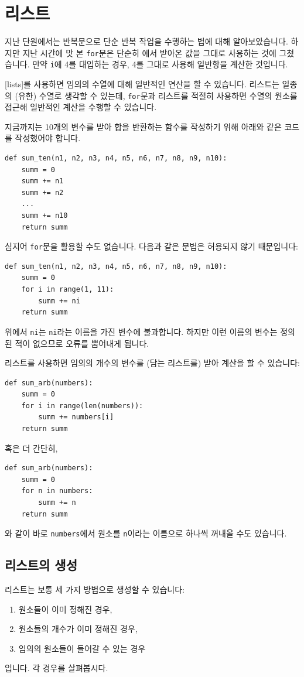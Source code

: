 \documentclass[../main.tex]{subfiles}
\begin{document}
\section{리스트}
지난 단원에서는 반복문으로 단순 반복 작업을 수행하는 법에 대해 알아보았습니다.
하지만 지난 시간에 맛 본 \texttt{for}문은 단순히 에서 받아온 값을 그대로 사용하는 것에 그쳤습니다.
만약 \texttt{i}에 4를 대입하는 경우, 4를 그대로 사용해 일반항을 계산한 것입니다.

[lists]를 사용하면 임의의 수열에 대해 일반적인 연산을 할 수 있습니다.
리스트는 일종의 (유한) 수열로 생각할 수 있는데, \texttt{for}문과 리스트를 적절히 사용하면 수열의 원소를 접근해 일반적인 계산을 수행할 수 있습니다.

지금까지는 10개의 변수를 받아 합을 반환하는 함수를 작성하기 위해 아래와 같은 코드를 작성했어야 합니다.
\begin{verbatim}
def sum_ten(n1, n2, n3, n4, n5, n6, n7, n8, n9, n10):
    summ = 0
    summ += n1
    summ += n2
    ...
    summ += n10
    return summ
\end{verbatim}
심지어 \texttt{for}문을 활용할 수도 없습니다.
다음과 같은 문법은 허용되지 않기 때문입니다:
\begin{verbatim}
def sum_ten(n1, n2, n3, n4, n5, n6, n7, n8, n9, n10):
    summ = 0
    for i in range(1, 11):
        summ += ni
    return summ
\end{verbatim}
위에서 \texttt{ni}는 \texttt{ni}라는 이름을 가진 변수에 불과합니다.
하지만 이런 이름의 변수는 정의된 적이 없으므로 오류를 뿜어내게 됩니다.

리스트를 사용하면 임의의 개수의 변수를 (담는 리스트를) 받아 계산을 할 수 있습니다:
\begin{verbatim}
def sum_arb(numbers):
    summ = 0
    for i in range(len(numbers)):
        summ += numbers[i]
    return summ
\end{verbatim}
혹은 더 간단히,
\begin{verbatim}
def sum_arb(numbers):
    summ = 0
    for n in numbers:
        summ += n
    return summ
\end{verbatim}
와 같이 바로 \verb/numbers/에서 원소를 \verb/n/이라는 이름으로 하나씩 꺼내올 수도 있습니다.

\subsection{리스트의 생성}
리스트는 보통 세 가지 방법으로 생성할 수 있습니다:
\begin{enumerate}
\item 원소들이 이미 정해진 경우,
\item 원소들의 개수가 이미 정해진 경우,
\item 임의의 원소들이 들어갈 수 있는 경우
\end{enumerate}
입니다.
각 경우를 살펴봅시다.
\end{document}
